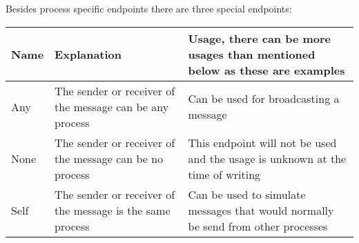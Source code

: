 Besides process specific endpoints there are three special endpoints:

\begin{longtable}[]{@{}lll@{}}
\toprule
\begin{minipage}[b]{0.20\columnwidth}\raggedright
Name\strut
\end{minipage} & \begin{minipage}[b]{0.44\columnwidth}\raggedright
Explanation\strut
\end{minipage} & \begin{minipage}[b]{0.27\columnwidth}\raggedright
Usage, there can be more usages than mentioned below as these are
examples\strut
\end{minipage}\tabularnewline
\midrule
\endhead
\begin{minipage}[t]{0.20\columnwidth}\raggedright
Any\strut
\end{minipage} & \begin{minipage}[t]{0.44\columnwidth}\raggedright
The sender or receiver of the message can be any process\strut
\end{minipage} & \begin{minipage}[t]{0.27\columnwidth}\raggedright
Can be used for broadcasting a message\strut
\end{minipage}\tabularnewline
\begin{minipage}[t]{0.20\columnwidth}\raggedright
None\strut
\end{minipage} & \begin{minipage}[t]{0.44\columnwidth}\raggedright
The sender or receiver of the message can be no process\strut
\end{minipage} & \begin{minipage}[t]{0.27\columnwidth}\raggedright
This endpoint will not be used and the usage is unknown at the time of
writing\strut
\end{minipage}\tabularnewline
\begin{minipage}[t]{0.20\columnwidth}\raggedright
Self\strut
\end{minipage} & \begin{minipage}[t]{0.44\columnwidth}\raggedright
The sender or receiver of the message is the same process\strut
\end{minipage} & \begin{minipage}[t]{0.27\columnwidth}\raggedright
Can be used to simulate messages that would normally be send from other
processes\strut
\end{minipage}\tabularnewline
\bottomrule
\end{longtable}

